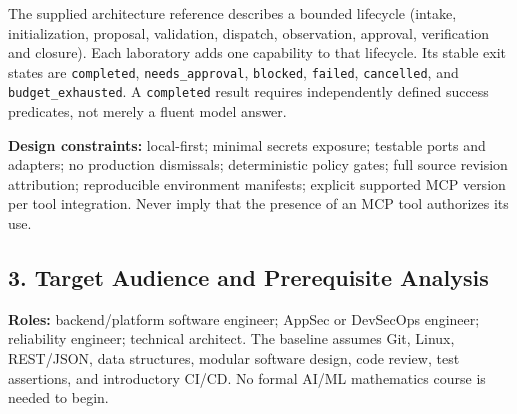 \documentclass[
  10pt,
]{article}
\begin{document}
The supplied architecture reference describes a bounded lifecycle
(intake, initialization, proposal, validation, dispatch, observation,
approval, verification and closure). Each laboratory adds one capability
to that lifecycle. Its stable exit states are \texttt{completed},
\texttt{needs\_approval}, \texttt{blocked}, \texttt{failed},
\texttt{cancelled}, and \texttt{budget\_exhausted}. A \texttt{completed}
result requires independently defined success predicates, not merely a
fluent model answer.

\textbf{Design constraints:} local-first; minimal secrets exposure;
testable ports and adapters; no production dismissals; deterministic
policy gates; full source revision attribution; reproducible environment
manifests; explicit supported MCP version per tool integration. Never
imply that the presence of an MCP tool authorizes its use.

\subsection{3. Target Audience and Prerequisite
Analysis}\label{target-audience-and-prerequisite-analysis}

\textbf{Roles:} backend/platform software engineer; AppSec or DevSecOps
engineer; reliability engineer; technical architect. The baseline
assumes Git, Linux, REST/JSON, data structures, modular software design,
code review, test assertions, and introductory CI/CD. No formal AI/ML
mathematics course is needed to begin.
\end{document}
